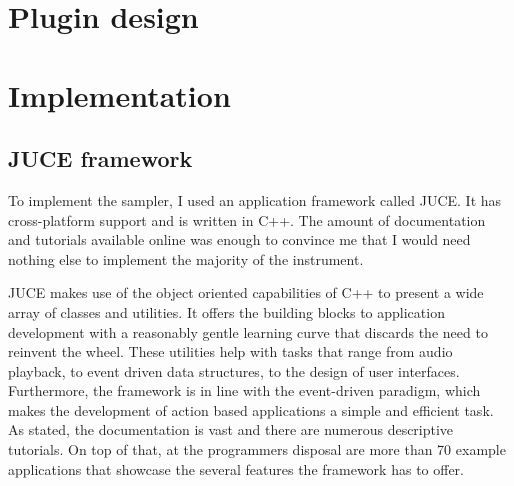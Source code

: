 \documentclass[12pt, a4paper, hidelinks]{article}
\begin{document}
	\section{Plugin design}
	
	
	\newpage
	\section{Implementation}
	\subsection{JUCE framework}
	To implement the sampler, I used an application framework called JUCE\cite{juceweb}. It has cross-platform support and is written in C++. The amount of documentation and tutorials available online was enough to convince me that I would need nothing else to implement the majority of the instrument.
	
	JUCE makes use of the object oriented capabilities of C++ to present a wide array of classes and utilities. It offers the building blocks to application development with a reasonably gentle learning curve that discards the need to reinvent the wheel. These utilities help with tasks that range from audio playback, to event driven data structures, to the design of user interfaces. Furthermore, the framework is in line with the event-driven paradigm, which makes the development of action based applications a simple and efficient task. As stated, the documentation is vast and there are numerous descriptive tutorials. On top of that, at the programmers disposal are more than 70 example applications that showcase the several features the framework has to offer. 
	
\end{document}
